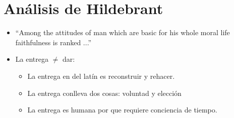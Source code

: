 \section{Análisis de Hildebrant}
\begin{itemize}
    \item ``Among the attitudes of man which are basic for his whole moral life faithfulness is ranked ...''
    \item La entrega $\neq$ dar:
        \begin{itemize}
            \item La entrega en del latín es reconstruir y rehacer.
            \item La entrega conlleva dos cosas: voluntad y elección 
            \item La entrega es humana por que requiere conciencia de tiempo. 
        \end{itemize}
\end{itemize}
